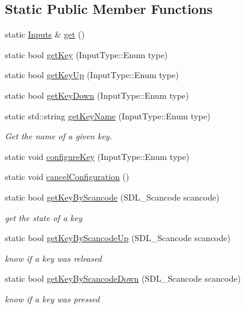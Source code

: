 \subsection*{Static Public Member Functions}
\begin{DoxyCompactItemize}
\item 
static \hyperlink{class_inputs}{Inputs} \& \hyperlink{class_inputs_afd9be7af3b695c51e3f8449e08a5e970}{get} ()
\item 
static bool \hyperlink{class_inputs_a775b7e5d409834058a8bc067b6f77998}{get\+Key} (Input\+Type\+::\+Enum type)
\item 
static bool \hyperlink{class_inputs_a3e6b234f0035948679c8ff831d1efc5a}{get\+Key\+Up} (Input\+Type\+::\+Enum type)
\item 
static bool \hyperlink{class_inputs_a212767ed4b6e8e66046fbc0ec04d7137}{get\+Key\+Down} (Input\+Type\+::\+Enum type)
\item 
static std\+::string \hyperlink{class_inputs_a868ed87a88ec0c694e5c27effeea2bc9}{get\+Key\+Name} (Input\+Type\+::\+Enum type)
\begin{DoxyCompactList}\small\item\em Get the name of a given key. \end{DoxyCompactList}\item 
static void \hyperlink{class_inputs_a61cc1d165b796b3be516d2fd083cc646}{configure\+Key} (Input\+Type\+::\+Enum type)
\item 
static void \hyperlink{class_inputs_aff002b44212b7ba7ba44adeb17375185}{cancel\+Configuration} ()
\item 
static bool \hyperlink{class_inputs_ab457f91d9083bfa07bdf3f37d950df60}{get\+Key\+By\+Scancode} (S\+D\+L\+\_\+\+Scancode scancode)
\begin{DoxyCompactList}\small\item\em get the state of a key \end{DoxyCompactList}\item 
static bool \hyperlink{class_inputs_a6617b70e3838546047d5701704276826}{get\+Key\+By\+Scancode\+Up} (S\+D\+L\+\_\+\+Scancode scancode)
\begin{DoxyCompactList}\small\item\em know if a key was released \end{DoxyCompactList}\item 
static bool \hyperlink{class_inputs_a034e4698e4c0745be637e53c18677fdb}{get\+Key\+By\+Scancode\+Down} (S\+D\+L\+\_\+\+Scancode scancode)
\begin{DoxyCompactList}\small\item\em know if a key was pressed \end{DoxyCompactList}\item 

\end{DoxyCompactItemize}
